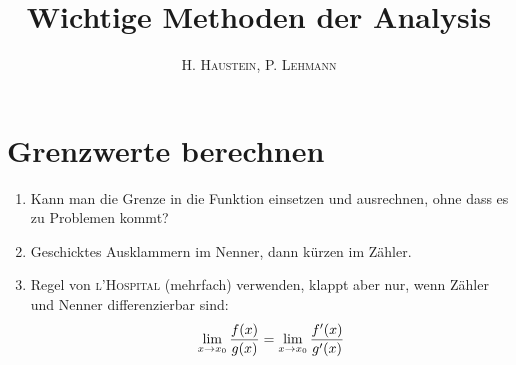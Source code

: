 \documentclass[ngerman,a4paper]{article}
\title{\textbf{Wichtige Methoden der Analysis}}
\author{\textsc{H. Haustein}, \textsc{P. Lehmann}}
\begin{document}
\maketitle

\section{Grenzwerte berechnen}
\begin{enumerate}[label=\textbf{\arabic*.}]
	\item Kann man die Grenze in die Funktion einsetzen und ausrechnen, ohne dass es zu Problemen kommt? 
	\item Geschicktes Ausklammern im Nenner, dann kürzen im Zähler.
	\item Regel von \textsc{l'Hospital} (mehrfach) verwenden, klappt aber nur, wenn Zähler und Nenner differenzierbar sind:
	\begin{align}
	\lim\limits_{x\to x_0}\frac{f(x)}{g(x)}=\lim\limits_{x\to x_0}\frac{f'(x)}{g'(x)}\notag
	\end{align}
\end{enumerate}
\end{document}
